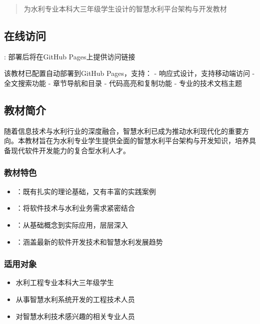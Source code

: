 \begin{quote}
为水利专业本科大三年级学生设计的智慧水利平台架构与开发教材
\end{quote}

\hypertarget{ux5728ux7ebfux8bbfux95ee-1}{%
\subsection{在线访问}\label{ux5728ux7ebfux8bbfux95ee-1}}

: 部署后将在GitHub Pages上提供访问链接

该教材已配置自动部署到GitHub Pages，支持： - 响应式设计，支持移动端访问 - \faSearch 全文搜索功能 - 章节导航和目录 - \faLightbulb 代码高亮和复制功能 - 专业的技术文档主题

\hypertarget{ux6559ux6750ux7b80ux4ecb-1}{%
\subsection{教材简介}\label{ux6559ux6750ux7b80ux4ecb-1}}

随着信息技术与水利行业的深度融合，智慧水利已成为推动水利现代化的重要方向。本教材旨在为水利专业学生提供全面的智慧水利平台架构与开发知识，培养具备现代软件开发能力的复合型水利人才。

\hypertarget{ux6559ux6750ux7279ux8272-1}{%
\subsubsection{教材特色}\label{ux6559ux6750ux7279ux8272-1}}

\begin{itemize}
\tightlist
\item
  ：既有扎实的理论基础，又有丰富的实践案例
\item
  ：将软件技术与水利业务需求紧密结合
\item
  ：从基础概念到实际应用，层层深入
\item
  ：涵盖最新的软件开发技术和智慧水利发展趋势
\end{itemize}

\hypertarget{ux9002ux7528ux5bf9ux8c61-1}{%
\subsubsection{适用对象}\label{ux9002ux7528ux5bf9ux8c61-1}}

\begin{itemize}
\tightlist
\item
  水利工程专业本科大三年级学生
\item
  从事智慧水利系统开发的工程技术人员
\item
  对智慧水利技术感兴趣的相关专业人员
\end{itemize}

